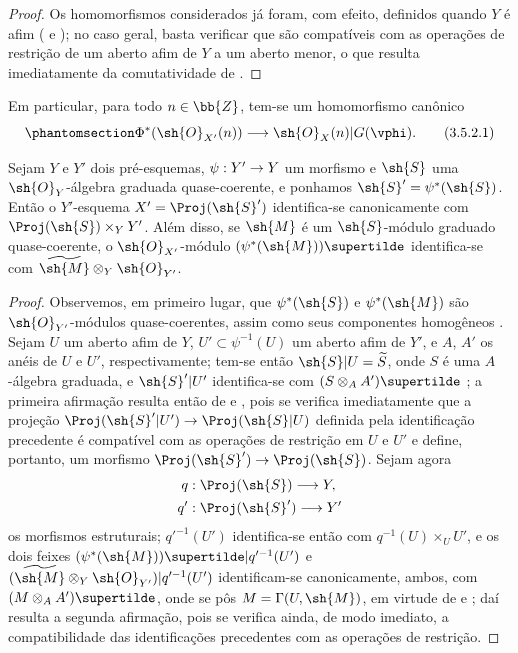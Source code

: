 \documentclass[oneside,10pt]{amsart}
\makeatletter
\newcommand{\ega@arrow}[2]{\mathchoice{#1}{#2}{#2}{#2}}
\renewcommand{\to}{\ega@arrow{\longrightarrow}{\rightarrow}}
\let\EGAOriginalLabel\label
\renewcommand{\label}[1]{\phantomsection\EGAOriginalLabel{#1}}
\makeatother
\begin{document}
\begin{proof}
Os homomorfismos considerados já foram, com efeito, definidos quando $Y$ é afim ( e );
no caso geral, basta verificar que são compatíveis com as operações de restrição de um aberto afim de $Y$ a um aberto menor, o que resulta imediatamente da comutatividade de .
\end{proof}

Em particular, para todo $n\in\bb{Z}$, tem-se um homomorfismo canônico
\[
\label{II.3.5.2.1}
  \Phi^*(\sh{O}_{X'}(n))\to\sh{O}_X(n)|G(\vphi).
\tag{3.5.2.1}
\]

\begin{proposition}[3.5.3]
\label{II.3.5.3}
Sejam $Y$ e $Y'$ dois pré-esquemas, $\psi:Y'\to Y$ um morfismo e $\sh{S}$ uma $\sh{O}_Y$-álgebra graduada quase-coerente, e ponhamos $\sh{S}'=\psi^*(\sh{S})$.
Então o $Y'$-esquema $X'=\Proj(\sh{S}')$ identifica-se canonicamente com $\Proj(\sh{S})\times_Y Y'$.
Além disso, se $\sh{M}$ é um $\sh{S}$-módulo graduado quase-coerente, o $\sh{O}_{X'}$-módulo $(\psi^*(\sh{M}))\supertilde$ identifica-se com $\widetilde{\sh{M}}\otimes_Y\sh{O}_{Y'}$.
\end{proposition}

\begin{proof}
Observemos, em primeiro lugar, que $\psi^*(\sh{S})$ e $\psi^*(\sh{M})$ são $\sh{O}_{Y'}$-módulos quase-coerentes, assim como seus componentes homogêneos .
Sejam $U$ um aberto afim de $Y$, $U'\subset\psi^{-1}(U)$ um aberto afim de $Y'$, e $A$, $A'$ os anéis de $U$ e $U'$, respectivamente;
tem-se então $\sh{S}|U=\widetilde{S}$, onde $S$ é uma $A$-álgebra graduada, e $\sh{S}'|U'$ identifica-se com $(S\otimes_A A')\supertilde$ ;
a primeira afirmação resulta então de  e , pois se verifica imediatamente que a projeção $\Proj(\sh{S}'|U')\to\Proj(\sh{S}|U)$ definida pela identificação precedente é compatível com as operações de restrição em $U$ e $U'$ e define, portanto, um morfismo $\Proj(\sh{S}')\to\Proj(\sh{S})$.
Sejam agora
\begin{align*}
  q &: \Proj(\sh{S})\to Y,
\\q'&: \Proj(\sh{S}')\to Y'
\end{align*}
os morfismos estruturais;
$q'^{-1}(U')$ identifica-se então com $q^{-1}(U)\times_U U'$, e os dois feixes $(\psi^*(\sh{M}))\supertilde|q'^{-1}(U')$ e $(\widetilde{\sh{M}}\otimes_Y\sh{O}_{Y'})|q'^{-1}(U')$ identificam-se canonicamente, ambos, com $(M\otimes_A A')\supertilde$, onde se pôs $M=\Gamma(U,\sh{M})$, em virtude de  e ;
daí resulta a segunda afirmação, pois se verifica ainda, de modo imediato, a compatibilidade das identificações precedentes com as operações de restrição.
\end{proof}
\end{document}
